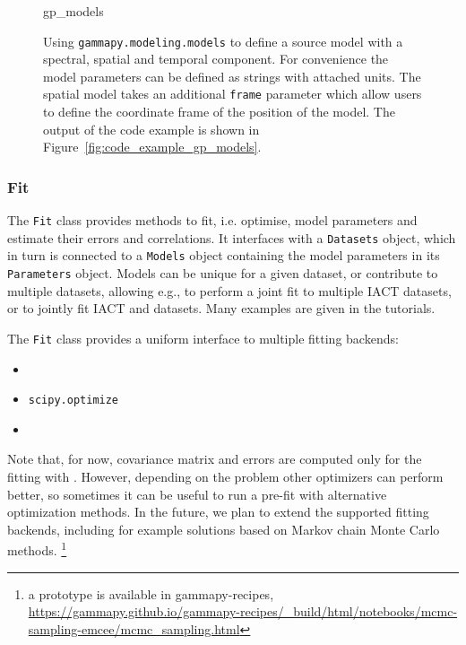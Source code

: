 \documentclass[longauth]{aa}
\newcommand{\code}[1]{\texttt{#1}}
\begin{document}
\begin{figure}
	\small
	{gp_models}
	\caption{Using \code{gammapy.modeling.models} to define a source model with a
    spectral, spatial and temporal component. For convenience the model
    parameters can be defined as strings with attached units. The spatial model
    takes an additional \code{frame} parameter which allow users to define
    the coordinate frame of the position of the model. The output
	of the code example is shown in Figure~\ref{fig:code_example_gp_models}.
    }
	\label{fig*:minted:gp_models}
\end{figure}

\subsubsection{Fit}
\label{sssec:fit}

The \code{Fit} class provides methods to fit, i.e. optimise, model parameters and estimate
their errors and correlations. It interfaces with a \code{Datasets} object, which
in turn is connected to a \code{Models} object containing the model parameters in its
\code{Parameters} object. Models can be unique for a given dataset, or contribute to
multiple datasets, allowing e.g., to perform a joint fit to
multiple IACT datasets, or to jointly fit IACT and \fermi datasets. Many
examples are given in the tutorials.

The \code{Fit} class provides a uniform interface to multiple fitting backends:
\begin{itemize}
	\setlength\itemsep{1em}
	\item \iminuit~\citep{iminuit}
	\item \code{scipy.optimize}~\citep{2020SciPy-NMeth}
	\item \sherpa~\citep{sherpa-2011, sherpa-2001}
\end{itemize}

Note that, for now, covariance matrix and errors are computed only for the fitting with 
\iminuit. However, depending on
the problem other optimizers can perform better, so sometimes it can be useful
to run a pre-fit with alternative optimization methods. In the future, we plan to
extend the supported fitting backends, including for example solutions based on Markov chain Monte Carlo methods.
\footnote{a prototype is available in gammapy-recipes,
	\url{https://gammapy.github.io/gammapy-recipes/_build/html/notebooks/mcmc-sampling-emcee/mcmc_sampling.html}
}
\end{document}
